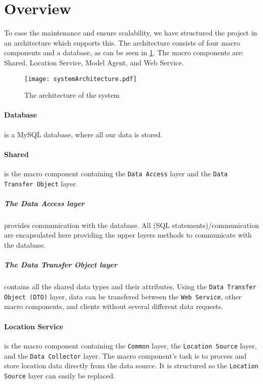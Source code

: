 \section{Overview}
To ease the maintenance and ensure scalability, we have structured the project in an architecture which supports this.
The architecture consists of four macro components and a database, as can be seen in \cref{fig:architecture}. The macro components are: Shared, Location Service, Model Agent, and Web Service.

%

\begin{figure}[H]
\texttt{[image: systemArchitecture.pdf]}
\caption{The architecture of the system}
\label{fig:architecture}
\end{figure}

\paragraph{Database} is a MySQL database, where all our data is stored.


\paragraph{Shared} is the macro component containing the \texttt{Data Access} layer and the \texttt{Data Transfer Object} layer.

\subparagraph{The Data Access layer} provides communication with the database.
All (SQL statements)/communication are encapsulated here providing the upper layers methods to communicate with the database.

\subparagraph{The Data Transfer Object layer} contains all the shared data types and their attributes.
Using the \texttt{Data Transfer Object (DTO)} layer, data can be transfered between the \texttt{Web Service}, other macro components, and clients without several different data requests.


\paragraph{Location Service} is the macro component containing the \texttt{Common} layer, the \texttt{Location Source} layer, and the \texttt{Data Collector} layer.
The macro component's task is to process and store location data directly from the data source. It is structured so the \texttt{Location Source} layer can easily be replaced.

